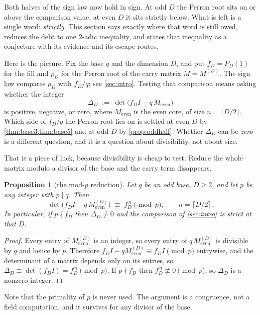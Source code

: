 \documentclass[11pt]{amsart}
\newtheorem{proposition}[theorem]{Proposition}
\theoremstyle{definition}
\theoremstyle{remark}
\begin{document}
Both halves of the sign law now hold in sign. At odd $D$ the Perron root sits on or above the comparison value, at even $D$ it sits strictly below. What is left is a single word: \emph{strictly}. This section says exactly where that word is still owed, reduces the debt to one $2$-adic inequality, and states that inequality as a conjecture with its evidence and its escape routes.

Here is the picture. Fix the base $q$ and the dimension $D$, and put $f_D = P_D(1)$ for the fill and $\rho_D$ for the Perron root of the carry matrix $M = M^{(D)}$. The sign law compares $\rho_D$ with $f_D/q$; see \cref{sec:intro}. Testing that comparison means asking whether the integer
\[
  \Delta_D \;:=\; \det\bigl(f_D I - q\,M_{\mathrm{even}}\bigr)
\]
is positive, negative, or zero, where $M_{\mathrm{even}}$ is the even core, of size $n = \lceil D/2 \rceil$. Which side of $f_D/q$ the Perron root lies on is settled at even $D$ by \cref{thm:base3,thm:base5} and at odd $D$ by \cref{prop:oddhalf}. Whether $\Delta_D$ can be \emph{zero} is a different question, and it is a question about divisibility, not about size.

That is a piece of luck, because divisibility is cheap to test. Reduce the whole matrix modulo a divisor of the base and the carry term disappears.

\begin{proposition}[the mod-$p$ reduction]
\label{b:prop:modp}
Let $q$ be an odd base, $D \ge 2$, and let $p$ be any integer with $p \mid q$. Then
\[
  \det\bigl(f_D I - q\,M_{\mathrm{even}}^{(D)}\bigr) \;\equiv\; f_D^{\,n} \pmod p,
  \qquad n = \lceil D/2 \rceil .
\]
In particular, if $p \nmid f_D$ then $\Delta_D \ne 0$ and the comparison of \cref{sec:intro} is strict at that $D$.
\end{proposition}

\begin{proof}
Every entry of $M_{\mathrm{even}}^{(D)}$ is an integer, so every entry of $q\,M_{\mathrm{even}}^{(D)}$ is divisible by $q$ and hence by $p$. Therefore $f_D I - q M_{\mathrm{even}}^{(D)} \equiv f_D I \pmod p$ entrywise, and the determinant of a matrix depends only on its entries, so $\Delta_D \equiv \det(f_D I) = f_D^{\,n} \pmod p$. If $p \nmid f_D$ then $f_D^{\,n} \not\equiv 0 \pmod p$, so $\Delta_D$ is a nonzero integer.
\end{proof}

Note that the primality of $p$ is never used. The argument is a congruence, not a field computation, and it survives for any divisor of the base.
\end{document}

